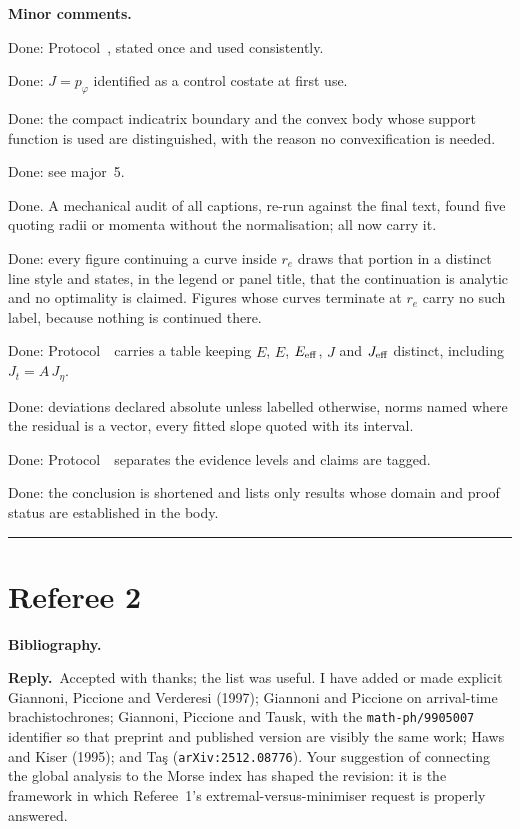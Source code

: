 \documentclass[11pt]{article}
\newcommand{\reply}{\par\noindent\textbf{Reply.}\ }
\newcommand{\R}[1]{\par\medskip\noindent\textbf{#1}\par\nopagebreak}
\begin{document}
\R{Minor comments.}
\begin{description}[leftmargin=2.4em,style=nextline,itemsep=0pt]
\item[M1] Done: Protocol~\msProtEndpoint, stated once and used consistently.
\item[M2] Done: $J=p_\varphi$ identified as a control costate at first use.
\item[M3] Done: the compact indicatrix boundary and the convex body whose support
function is used are distinguished, with the reason no convexification is needed.
\item[M4] Done: see major~5.
\item[M5] Done. A mechanical audit of all captions, re-run against the final text,
found five quoting radii or momenta without the normalisation; all now carry it.
\item[M6] Done: every figure continuing a curve inside $r_e$ draws that portion in a
distinct line style and states, in the legend or panel title, that the continuation
is analytic and no optimality is claimed. Figures whose curves terminate at $r_e$
carry no such label, because nothing is continued there.
\item[M7] Done: Protocol~\msProtNames\ carries a table keeping $E$, $\hat E$,
$E_{\rm eff}$, $J$ and $J_{\rm eff}$ distinct, including $J_t=A\,J_\eta$.
\item[M8] Done: deviations declared absolute unless labelled otherwise, norms named
where the residual is a vector, every fitted slope quoted with its interval.
\item[M9] Done: Protocol~\msProtEvidence\ separates the evidence levels and claims
are tagged.
\item[M10] Done: the conclusion is shortened and lists only results whose domain and
proof status are established in the body.
\end{description}

\bigskip\hrule
\section*{Referee 2}

\R{Bibliography.}
\reply Accepted with thanks; the list was useful. I have added or made explicit
Giannoni, Piccione and Verderesi (1997); Giannoni and Piccione on arrival-time
brachistochrones; Giannoni, Piccione and Tausk, with the \texttt{math-ph/9905007}
identifier so that preprint and published version are visibly the same work; Haws
and Kiser (1995); and Ta\c{s} (\texttt{arXiv:2512.08776}). Your suggestion of
connecting the global analysis to the Morse index has shaped the revision: it is the
framework in which Referee~1's extremal-versus-minimiser request is properly
answered.
\end{document}
